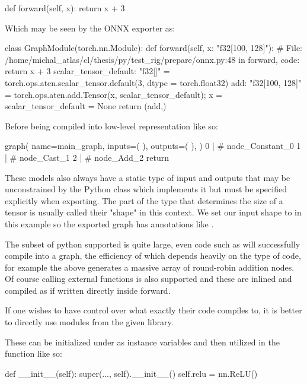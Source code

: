     def forward(self, x):
        return x + 3
\endtt

Which may be seen by the ONNX exporter as:

\begtt
class GraphModule(torch.nn.Module):
    def forward(self, x: "f32[100, 128]"):
         # File: /home/michal_atlas/cl/thesis/py/test_rig/prepare/onnx.py:48 in forward, code: return x + 3
        scalar_tensor_default: "f32[]" = torch.ops.aten.scalar_tensor.default(3, dtype = torch.float32)
        add: "f32[100, 128]" = torch.ops.aten.add.Tensor(x, scalar_tensor_default);  x = scalar_tensor_default = None
        return (add,)
\endtt

Before being compiled into low-level representation like so:

\begtt
graph(
    name=main_graph,
    inputs=(
    ),
    outputs=(
    ),
) {
    0 |  # node_Constant_0
    1 |  # node_Cast_1
    2 |  # node_Add_2
    return %
}
\endtt

These models also always have a static type of input and outputs
that may be unconstrained by the Python class which implements it
but must be specified explicitly when exporting.
The part of the type that determines the size of a tensor
is usually called their "shape" in this context.
We set our input shape to  in this example
so the exported graph has annotations like .

The subset of python supported is quite large,
even code such as 
will successfully compile into a graph,
the efficiency of which depends heavily on
the type of code,
for example the above generates a massive
array of round-robin addition nodes.
Of course calling external functions is also supported
and these are inlined and compiled as if written
directly inside forward.

If one wishes to have control over what
exactly their code compiles to,
it is better to directly use modules from the given library.

These can be initialized under 
as instance variables and then utilized in
the  function like so:

\begtt {}
def __init__(self):
  super(..., self).__init__()
  self.relu = nn.ReLU()

